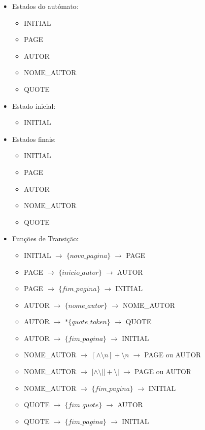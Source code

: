 \documentclass[11pt,a4paper]{report}
\begin{document}
\begin{itemize}
	\item Estados do autómato:
		\begin{itemize}
			\item INITIAL
			\item PAGE
			\item AUTOR
			\item NOME\_AUTOR
			\item QUOTE
		\end{itemize}
	\item Estado inicial:
		\begin{itemize}
			\item INITIAL
		\end{itemize}
	\item Estados finais:
		\begin{itemize}
			\item INITIAL
			\item PAGE
			\item AUTOR
			\item NOME\_AUTOR
			\item QUOTE
		\end{itemize}
	\item Funções de Transição:
		\begin{itemize}
			\item INITIAL $\rightarrow$ $\{nova\_pagina\}$ $\rightarrow$ PAGE
			\item PAGE $\rightarrow$ $\{inicio\_autor\}$ $\rightarrow$ AUTOR
			\item PAGE $\rightarrow$ $\{fim\_pagina\} $ $\rightarrow$ INITIAL
			\item AUTOR $\rightarrow$ $\{nome\_autor\}$ $\rightarrow$ NOME\_AUTOR
			\item AUTOR $\rightarrow$ $*\{quote\_token\}$ $\rightarrow$ QUOTE
			\item AUTOR $\rightarrow$ $\{fim\_pagina\} $ $\rightarrow$ INITIAL
			\item NOME\_AUTOR $\rightarrow$ $ [ \wedge \setminus n]+\setminus n $ $\rightarrow$ PAGE ou AUTOR
			\item NOME\_AUTOR $\rightarrow$ $ [ \wedge \setminus |]+\setminus | $ $\rightarrow$ PAGE ou AUTOR
			\item NOME\_AUTOR $\rightarrow$ $\{fim\_pagina\} $ $\rightarrow$ INITIAL
			\item QUOTE $\rightarrow$ $\{fim\_quote\} $ $\rightarrow$ AUTOR
			\item QUOTE $\rightarrow$ $\{fim\_pagina\} $ $\rightarrow$ INITIAL
		\end{itemize}
\end{itemize}
\end{document}
